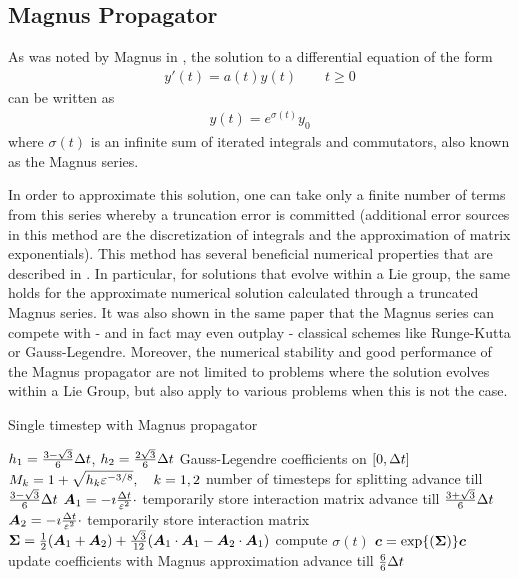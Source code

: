 \subsection{Magnus Propagator}
\label{sub:magnus_propagator}
%
As was noted by Magnus in \cite{Magnus1954}, the solution to a differential equation of the form
%
\begin{align}
	y'(t) = a(t) y(t) \qquad t \ge 0
\end{align}
%
can be written as
%
\begin{align}
	y(t) = e^{\sigma (t)} y_0
\end{align}
%
where $\sigma (t)$ is an infinite sum of iterated integrals and commutators, also known as the Magnus series.
\par\medskip
%
In order to approximate this solution, one can take only a finite number of terms from this series whereby a truncation error is committed
(additional error sources in this method are the discretization of integrals and the approximation of matrix exponentials).
%
This method has several beneficial numerical properties that are described in \cite{Iserles1999}.
In particular, for solutions that evolve within a Lie group, the same holds for the approximate numerical solution calculated through a truncated Magnus series. 
It was also shown in the same paper that the Magnus series can compete with - and in fact may even outplay - classical schemes like Runge-Kutta or Gauss-Legendre.
Moreover, the numerical stability and good performance of the Magnus propagator are not limited to problems where the solution evolves within a Lie Group, but also apply to various problems when this is not the case.

\begin{algorithm}[h]
	\caption{Single timestep with Magnus propagator}
	\label{alg:magnus}
	\begin{algorithmic}
		\State
		\State $h_1 = \frac{3-\sqrt{3}}{6} \Delta t$, $h_2 = \frac{2\sqrt{3}}{6} \Delta t$
		\Comment Gauss-Legendre coefficients on $[0,\Delta t]$
		\State $M_{k} = 1+\sqrt{h_{k} \varepsilon^{-3/8}}, \quad k=1,2$
		\Comment number of timesteps for splitting
		\State
		\State {}
		\Comment advance till $\frac{3-\sqrt{3}}{6} \Delta t$
		\State $\bm{A}_1 = - \imath \frac{\Delta t}{\varepsilon^2} \cdot$ 
		\Comment temporarily store interaction matrix
		\State {}
		\Comment advance till $\frac{3+\sqrt{3}}{6} \Delta t$
		\State $\bm{A}_2 = - \imath \frac{\Delta t}{\varepsilon^2} \cdot$ 
		\Comment temporarily store interaction matrix
		\State $\bm{\Sigma} = \frac{1}{2} (\bm{A}_1 + \bm{A}_2) + \frac{\sqrt{3}}{12} (\bm{A}_1 \cdot \bm{A}_1 - \bm{A}_2 \cdot \bm{A}_1)$
		\Comment compute $\sigma (t)$
		\State $\bm{c} = \exp{ \left( \bm{\Sigma} \right) } \bm{c}$
		\Comment update coefficients with Magnus approximation
		\State {}
		\Comment advance till $\frac{6}{6} \Delta t$
		\State
	\EndProcedure
	\end{algorithmic}
\end{algorithm}

